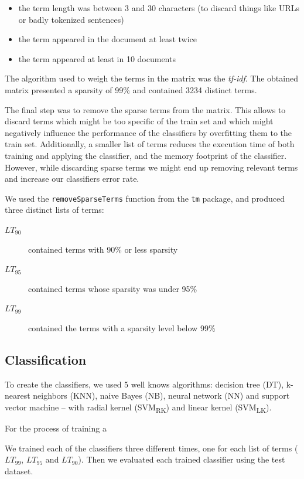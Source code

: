 \documentclass[conference]{IEEEtran}
\begin{document}
\begin{itemize}
    \item the term length was between 3 and 30 characters (to discard
        things like URLs or badly tokenized sentences)
    \item the term appeared in the document at least twice
    \item the term appeared at least in 10 documents
\end{itemize}
The algorithm used to weigh the terms in the matrix was the
\textit{tf-idf}\cite{christopher2008introduction}. The obtained matrix
presented a sparsity of 99\% and contained 3234 distinct terms.

The final step was to remove the sparse terms from the matrix.
This allows to discard terms which might be too specific of the train
set and which might negatively influence the performance of the
classifiers by overfitting them to the train set. Additionally, a
smaller list of terms reduces the execution time of both training and
applying the classifier, and the memory footprint of the classifier.
However, while discarding sparse terms we might end up removing
relevant terms and increase our classifiers error rate.

We used the \texttt{removeSparseTerms} function from the \texttt{tm}
package, and produced three distinct lists of terms:
\begin{description}
    \item[$LT_{90}$] contained terms with 90\% or less sparsity
    \item[$LT_{95}$] contained terms whose sparsity was under 95\%
    \item[$LT_{99}$] contained the terms with a sparsity level below 99\%
\end{description}

\subsection{Classification}

To create the classifiers, we used 5 well knows algorithms: decision
tree (DT), k-nearest neighbors (KNN), naive Bayes (NB), neural network
(NN) and support vector
machine -- with radial kernel (SVM\textsubscript{RK}) and linear
kernel (SVM\textsubscript{LK}).

For the process of training a

We trained each of the classifiers three different times, one for each
list of terms ($LT_{99}$, $LT_{95}$ and $LT_{90}$). Then we evaluated
each trained classifier using the test dataset.
\end{document}
